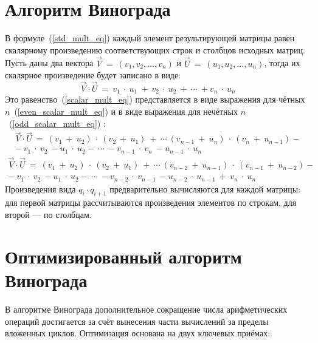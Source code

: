 \section{Алгоритм Винограда}
В формуле~(\ref{std_mult_eq}) каждый элемент результирующей матрицы равен скалярному произведению соответствующих строк и столбцов исходных матриц.
Пусть даны два вектора $\overrightarrow{V}~=~(v_1, v_2, \dots, v_n)$ и $\overrightarrow{U}~=~(u_1, u_2, \dots, u_n)$, тогда их скалярное произведение будет записано в виде:
\begin{equation}
	\label{scalar_mult_eq}
	\overrightarrow{V}\cdot\overrightarrow{U}~=~v_1~\cdot~u_1~+~v_2~\cdot~u_2~+~\cdots~+v_n~\cdot~u_n
\end{equation}
Это равенство~(\ref{scalar_mult_eq}) представляется в виде выражения для чётных $n$~(\ref{even_scalar_mult_eq}) и в виде выражения для нечётных $n$~(\ref{odd_scalar_mult_eq}) :
\begin{equation}
	\label{even_scalar_mult_eq}
	\begin{matrix}
		\overrightarrow{V}\cdot\overrightarrow{U}~=~(v_1~+~u_2)~\cdot~(v_2~+~u_1)~+~\cdots~(v_{n-1}~+~u_{n})~\cdot~(v_{n}~+~u_{n-1})- \\ -~v_1~\cdot~v_2~-u_1~\cdot~u_2-~\cdots~-v_{n-1}~\cdot~v_{n}~-u_{n-1}~\cdot~u_{n}
	\end{matrix}
\end{equation}
\begin{equation}
	\label{odd_scalar_mult_eq}
	\begin{matrix}
		\overrightarrow{V}\cdot\overrightarrow{U}~=~(v_1~+~u_2)~\cdot~(v_2~+~u_1)~+~\cdots~(v_{n-2}~+~u_{n-1})~\cdot~(v_{n-1}~+~u_{n-2})-\\  -~v_1~\cdot~v_2~-u_1~\cdot~u_2-~\cdots~-v_{n-2}~\cdot~v_{n-1}~-u_{n-2}~\cdot~u_{n-1}~+~v_n~\cdot~u_n
	\end{matrix}
\end{equation}
Произведения вида $q_{i} \cdot q_{i+1}$ предварительно вычисляются для каждой матрицы: для первой матрицы рассчитываются произведения элементов по строкам, для второй --- по столбцам.


\section{Оптимизированный алгоритм Винограда}
В алгоритме Винограда дополнительное сокращение числа арифметических операций достигается за счёт вынесения части вычислений за пределы вложенных циклов. 
Оптимизация основана на двух ключевых приёмах:

